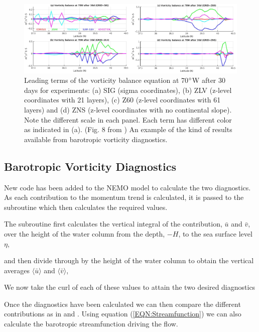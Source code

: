 \documentclass[..\EOYR.tex]{subfiles}
\begin{document}
\begin{figure}[t]
    \includegraphics[width=\linewidth]{Figures/Ezer2016bFig8.jpg}
    \caption{Leading terms of the vorticity balance equation at 70$\degree$W after 30 days for experiments: (a) SIG (sigma coordinates), (b) ZLV (z-level coordinates with 21 layers), (c) Z60 (z-level coordinates with 61 layers) and (d) ZNS (z-level coordinates with no continental slope). Note the different scale in each panel. Each term has different color as indicated in (a). (Fig. 8 from \citep{Ezer2016b}) An example of the kind of results available from barotropic vorticity diagnostics.}
    \label{FIG:Ezer2016bFig8}
\end{figure}


\subsection{Barotropic Vorticity Diagnostics}
\label{SSEC:BVDiagnostics}


New code has been added to the NEMO model 
to calculate the two diagnostics. As each contribution to the momentum trend is calculated, it is passed to the subroutine which then calculates the required values.

The subroutine first calculates the vertical integral of the contribution, $\bar{u}$ and $\bar{v}$, over the height of the water column from the depth, $-H$, to the sea surface level $\eta$,


and then divide through by the height of the water column to obtain the vertical averages $\langle\bar{u}\rangle$ and $\langle\bar{v}\rangle$,


We now take the curl of each of these values to attain the two desired diagnostics


    
Once the diagnostics have been calculated we can then compare the different contributions as in \citep{Yeager2015} and \citep{Gula2014}. Using equation (\ref{EQN:Streamfunction}) we can also calculate the barotropic streamfunction driving the flow.\\
\end{document}
